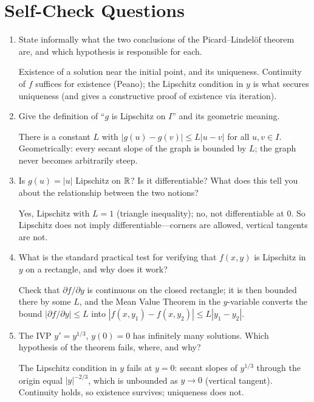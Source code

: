\documentclass{essay}
\begin{document}
\section{Self-Check Questions}

\begin{enumerate}[leftmargin=*, itemsep=8pt]

  \item State informally what the two conclusions of the Picard--Lindel\"of theorem are, and which hypothesis is responsible for each.
    \begin{answer}
      Existence of a solution near the initial point, and its uniqueness. Continuity of $f$ suffices for existence (Peano); the Lipschitz condition in $y$ is what secures uniqueness (and gives a constructive proof of existence via iteration).
    \end{answer}

  \item Give the definition of ``$g$ is Lipschitz on $I$'' and its geometric meaning.
    \begin{answer}
      There is a constant $L$ with $|g(u) - g(v)| \leq L|u-v|$ for all $u, v \in I$. Geometrically: every secant slope of the graph is bounded by $L$; the graph never becomes arbitrarily steep.
    \end{answer}

  \item Is $g(u) = |u|$ Lipschitz on $\mathbb{R}$? Is it differentiable? What does this tell you about the relationship between the two notions?
    \begin{answer}
      Yes, Lipschitz with $L = 1$ (triangle inequality); no, not differentiable at $0$. So Lipschitz does not imply differentiable---corners are allowed, vertical tangents are not.
    \end{answer}

  \item What is the standard practical test for verifying that $f(x,y)$ is Lipschitz in $y$ on a rectangle, and why does it work?
    \begin{answer}
      Check that $\partial f / \partial y$ is continuous on the closed rectangle; it is then bounded there by some $L$, and the Mean Value Theorem in the $y$-variable converts the bound $|\partial f/\partial y| \leq L$ into $|f(x,y_1) - f(x,y_2)| \leq L|y_1 - y_2|$.
    \end{answer}

  \item The IVP $y' = y^{1/3}$, $y(0) = 0$ has infinitely many solutions. Which hypothesis of the theorem fails, where, and why?
    \begin{answer}
      The Lipschitz condition in $y$ fails at $y = 0$: secant slopes of $y^{1/3}$ through the origin equal $|y|^{-2/3}$, which is unbounded as $y \to 0$ (vertical tangent). Continuity holds, so existence survives; uniqueness does not.
    \end{answer}


\end{enumerate}
\end{document}
